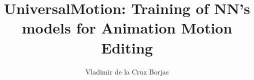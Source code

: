 \documentclass[letterpaper,11pt,onecolumn,final]{report}              %
\author{Vladimir de la Cruz Borjas}    %
\title{UniversalMotion: Training of NN's models for Animation Motion Editing}    %
\begin{document}
	








\appendix
\setcounter{table}{0}		%
\setcounter{figure}{0}		%
\renewcommand{\thefigure}{\Alph{chapter}.\arabic{figure}} 	%
\renewcommand{\thetable}{\Alph{chapter}.\arabic{table}}		%

\begin{appendices}
    
\end{appendices}





\end{document}
